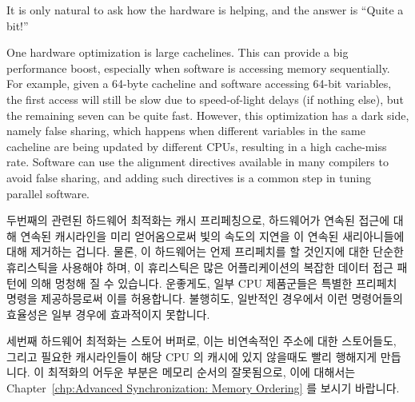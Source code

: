 It is only natural to ask how the hardware is helping, and the answer
is ``Quite a bit!''

One hardware optimization is large cachelines.
This can provide a big performance boost, especially when software is
accessing memory sequentially.
For example, given a 64-byte cacheline and software accessing 64-bit
variables, the first access will still be slow due to speed-of-light
delays (if nothing else), but the remaining seven can be quite fast.
However, this optimization has a dark side, namely false sharing,
which happens when different variables in the same cacheline are
being updated by different CPUs, resulting in a high cache-miss rate.
Software can use the alignment directives available in many compilers
to avoid false sharing, and adding such directives is a common step
in tuning parallel software.
\fi

두번째의 관련된 하드웨어 최적화는 캐시 프리페칭으로, 하드웨어가 연속된 접근에
대해 연속된 캐시라인을 미리 얻어옴으로써 빛의 속도의 지연을 이 연속된
새리아니들에 대해 제거하는 겁니다.
물론, 이 하드웨어는 언제 프리페치를 할 것인지에 대한 단순한 휴리스틱을 사용해야
하며, 이 휴리스틱은 많은 어플리케이션의 복잡한 데이터 접근 패턴에 의해 멍청해
질 수 있습니다.
운좋게도, 일부 CPU 제품군들은 특별한 프리페치 명령을 제공하믕로써 이를
허용합니다.
불행히도, 일반적인 경우에서 이런 명령어들의 효율성은 일부 경우에 효과적이지
못합니다.

세번째 하드웨어 최적화는 스토어 버퍼로, 이는 비연속적인 주소에 대한 스토어들도,
그리고 필요한 캐시라인들이 해당 CPU 의 캐시에 있지 않을때도 빨리 행해지게
만듭니다.
이 최적화의 어두운 부분은 메모리 순서의 잘못됨으로, 이에 대해서는
Chapter~\ref{chp:Advanced Synchronization: Memory Ordering}
를 보시기 바랍니다.

